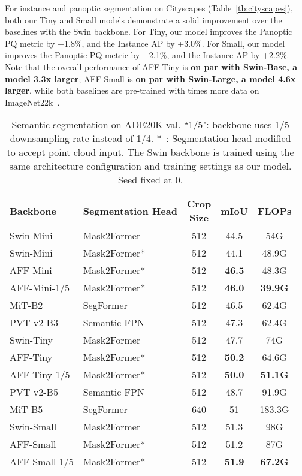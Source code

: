 \documentclass[10pt,twocolumn,letterpaper]{article}
\begin{document}
For instance and panoptic segmentation on Cityscapes (Table~\ref{tb:cityscapes}), both our Tiny and Small models demonstrate a solid improvement over the baselines with the Swin backbone. For Tiny, our model improves the Panoptic PQ metric by +1.8\%, and the Instance AP by +3.0\%. For Small, our model improves the Panoptic PQ metric by +2.1\%, and the Instance AP by +2.2\%. Note that the overall performance of AFF-Tiny is \textbf{on par with Swin-Base, a model 3.3x larger}; AFF-Small is \textbf{on par with Swin-Large, a model 4.6x larger}, while both baselines are pre-trained with  times more data on  ImageNet22k~\cite{imagenet21k}.

\begin{table}
\begin{center}
\begin{footnotesize}
\begin{tabular}{llccc}
Backbone & Segmentation Head & \makecell{Crop\\Size} & mIoU & FLOPs\\\hline
Swin-Mini & Mask2Former~\cite{mask2} & 512 & 44.5 & 54G \\
Swin-Mini & Mask2Former*~\cite{mask2} & 512 & 44.1 & 48.9G \\
\hdashline
AFF-Mini & Mask2Former*~\cite{mask2} & 512 & \textbf{46.5} & 48.3G \\
AFF-Mini-1/5 & Mask2Former*~\cite{mask2} & 512 & \textbf{46.0} & \textbf{39.9G} \\
\hline
MiT-B2 & SegFormer~\cite{segformer} & 512 & 46.5 & 62.4G \\
PVT v2-B3~\cite{pvtv2} & Semantic FPN~\cite{semanticfpn} & 512 & 47.3 & 62.4G \\
Swin-Tiny & Mask2Former~\cite{mask2} & 512 & 47.7 & 74G \\
\hdashline
AFF-Tiny & Mask2Former*~\cite{mask2} & 512 &  \textbf{50.2} & 64.6G \\
AFF-Tiny-1/5 & Mask2Former*~\cite{mask2} & 512 & \textbf{50.0} & \textbf{51.1G} \\
\hline
PVT v2-B5~\cite{pvtv2} & Semantic FPN~\cite{semanticfpn} & 512 & 48.7 & 91.9G \\
MiT-B5 & SegFormer~\cite{segformer} & 640 & 51 & 183.3G \\
Swin-Small & Mask2Former~\cite{mask2} & 512 & 51.3 & 98G \\
\hdashline
AFF-Small & Mask2Former*~\cite{mask2} & 512 & 51.2 & 87G \\
AFF-Small-1/5 & Mask2Former*~\cite{mask2} & 512 & \textbf{51.9} & \textbf{67.2G} \\
\hline
\end{tabular}
\end{footnotesize}
\end{center}
\vspace{-0.6cm}
\caption{Semantic segmentation on ADE20K val. ``1/5": backbone uses 1/5 downsampling rate instead of 1/4. *~: Segmentation head modified to accept point cloud input. 
The Swin backbone is trained using the same architecture configuration and training settings as our model. Seed fixed at 0.
}
\label{tb:ade}
\vskip -0.1in
\end{table}
\end{document}
